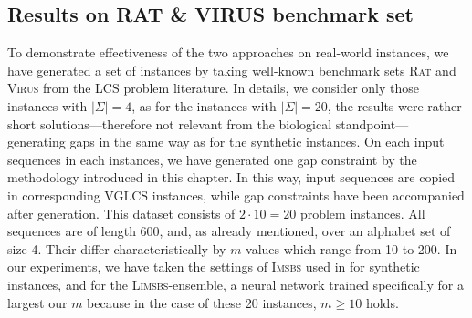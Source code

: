 \documentclass[11pt,a4paper]{article}
\begin{document}
 \subsection{Results on RAT \& VIRUS benchmark set}
 
 To demonstrate effectiveness of the two approaches on real-world instances, we have generated a set of instances by taking well-known benchmark sets \textsc{Rat} and \textsc{Virus} from the LCS problem literature. In details, we consider only those instances with $|\Sigma|=4$, as for the instances with $|\Sigma|=20$, the results were rather short solutions---therefore not relevant from the biological standpoint---  generating gaps in the same way as for the synthetic instances.  On each input sequences in each instances, we have generated one gap constraint by the methodology introduced in this chapter. In this way, input sequences are copied in corresponding VGLCS instances, while gap constraints have been accompanied  after generation. This dataset consists of $2\cdot 10=20$ problem instances. All sequences are of length 600, and, as already mentioned, over an alphabet set of size 4. Their differ characteristically by $m$ values which range from 10 to 200. In our experiments, we have taken the settings of \textsc{Imsbs} used in for synthetic instances, and for the \textsc{Limsbs}-ensemble, a neural network trained specifically for a largest our $m$ because in the case of these 20 instances,  $m\geq 10$ holds.
 
 
 
 
\end{document}
